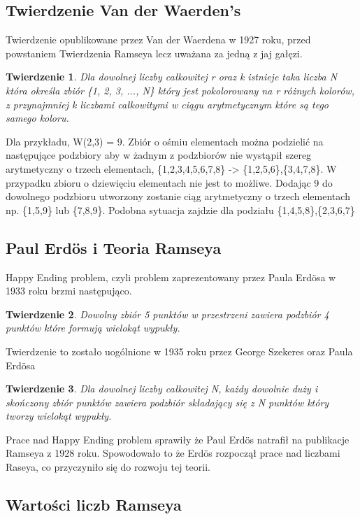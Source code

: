 \documentclass[11pt]{article}
\newtheorem{theorem}{Twierdzenie}
\begin{document}
\subsection{Twierdzenie Van der Waerden's}
Twierdzenie opublikowane przez Van der Waerdena w 1927 roku, przed powstaniem Twierdzenia Ramseya lecz uważana za jedną z jaj gałęzi. 

\begin{theorem}
Dla dowolnej liczby całkowitej r oraz k istnieje taka liczba N która określa zbiór \{1, 2, 3, ..., N\} który jest pokolorowany na r różnych kolorów, z przynajmniej k liczbami całkowitymi w ciągu arytmetycznym które są tego samego koloru.
\end{theorem}

Dla przykładu, W(2,3) = 9. Zbiór o ośmiu elementach można podzielić na następujące podzbiory aby w żadnym z podzbiorów nie wystąpił szereg arytmetyczny o trzech elementach, \{1,2,3,4,5,6,7,8\} -> \{1,2,5,6\},\{3,4,7,8\}. W przypadku zbioru o dziewięciu elementach nie jest to możliwe. Dodając 9 do dowolnego podzbioru utworzony zostanie ciąg arytmetyczny o trzech elementach np. \{1,5,9\} lub \{7,8,9\}. Podobna sytuacja zajdzie dla podziału \{1,4,5,8\},\{2,3,6,7\}

\subsection{Paul Erd\"os i Teoria Ramseya}

Happy Ending problem, czyli problem zaprezentowany przez Paula Erd\"osa w 1933 roku brzmi następująco. 

\begin{theorem}
Dowolny zbiór 5 punktów w przestrzeni zawiera podzbiór 4 punktów które formują wielokąt wypukły.
\end{theorem}

Twierdzenie to zostało uogólnione w 1935 roku przez George Szekeres oraz Paula Erd\"osa

\begin{theorem}
Dla dowolnej liczby całkowitej N, każdy dowolnie duży i skończony zbiór punktów zawiera podzbiór składający się z N punktów który tworzy wielokąt wypukły.
\end{theorem}

Prace nad Happy Ending problem sprawiły że Paul Erd\"os natrafił na publikacje Ramseya z 1928 roku. Spowodowało to że Erd\"os rozpoczął prace nad liczbami Raseya, co przyczyniło się do rozwoju tej teorii.

\subsection{Wartości liczb Ramseya}
\end{document}
